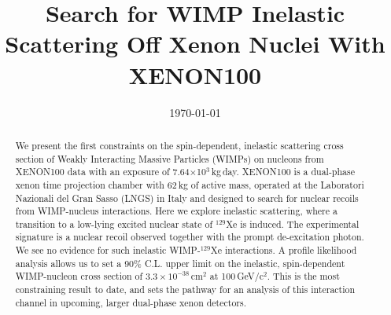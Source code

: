 \documentclass[%
 reprint,
superscriptaddress,
linenumbers,
 amsmath,amssymb,
 aps,
]{revtex4-1}
\begin{document}
\title{Search for WIMP Inelastic Scattering Off Xenon Nuclei With XENON100}%

\noaffiliation

\date{\today}

\begin{abstract}
We present the first constraints on the spin-dependent, inelastic scattering cross section of Weakly Interacting Massive Particles (WIMPs) on nucleons from XENON100 data with an exposure of 7.64$\times$10$^3$\,kg\,day. XENON100 is a dual-phase xenon time projection chamber with 62\,kg of active mass, operated at the Laboratori Nazionali del Gran Sasso (LNGS) in Italy and designed to search for nuclear recoils from WIMP-nucleus interactions. Here we explore inelastic scattering, where a transition to a low-lying excited nuclear state of $^{129}$Xe is induced. The experimental signature is a nuclear recoil observed together with the prompt de-excitation photon. We see no evidence for such inelastic WIMP-$^{129}$Xe interactions. A profile likelihood analysis allows us to set a 90\% C.L. upper limit on the inelastic, spin-dependent WIMP-nucleon cross section of $3.3 \times 10^{-38}$\,cm$^{2}$  at 100\,GeV/c$^2$.  This is the most constraining result to date, and sets the pathway for an analysis of this interaction channel in upcoming, larger dual-phase xenon detectors.

\end{abstract}

\maketitle












 

\end{document}
